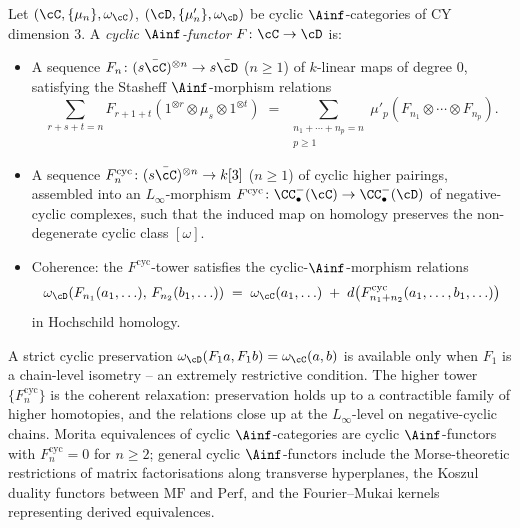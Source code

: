 \begin{definition}[Cyclic $\Ainf$-functor at $d = 3$]
\label{defn:cyclic-ainfty-functor-d3}
Let $(\cC, \{\mu_n\}, \omega_\cC)$, $(\cD, \{\mu'_n\}, \omega_\cD)$ be
cyclic $\Ainf$-categories of CY dimension $3$.  A \emph{cyclic
$\Ainf$-functor} $F \colon \cC \to \cD$ is:
\begin{itemize}
 \item A sequence $F_n \colon (s\bar\cC)^{\otimes n} \to s\bar\cD$
       ($n \geq 1$) of $k$-linear maps of degree $0$, satisfying the
       Stasheff $\Ainf$-morphism relations
       \[
        \sum_{r+s+t=n}
        F_{r+1+t}(1^{\otimes r} \otimes \mu_s \otimes 1^{\otimes t})
        \;=\;
        \sum_{\substack{n_1 + \cdots + n_p = n \\ p \geq 1}}
        \mu'_p(F_{n_1} \otimes \cdots \otimes F_{n_p}).
       \]
 \item A sequence $F_n^{\mathrm{cyc}} \colon
       (s\bar\cC)^{\otimes n} \to k[3]$ ($n \geq 1$) of cyclic
       higher pairings, assembled into an $L_\infty$-morphism
       $F^{\mathrm{cyc}} \colon \CC^{-}_\bullet(\cC) \to
       \CC^{-}_\bullet(\cD)$ of negative-cyclic complexes,
       such that the induced map on homology preserves the
       non-degenerate cyclic class $[\omega]$.
 \item Coherence: the $F^{\mathrm{cyc}}$-tower satisfies the
       cyclic-$\Ainf$-morphism relations
       \[
         \omega_\cD(F_{n_1}(a_1,\ldots),\, F_{n_2}(b_1,\ldots))
         \;=\;
         \omega_\cC(a_1,\ldots)
         \;+\; d\bigl(F_{n_1+n_2}^{\mathrm{cyc}}(a_1,\ldots,b_1,\ldots)\bigr)
       \]
       in Hochschild homology.
\end{itemize}
\end{definition}

\begin{remark}
\label{rem:why-higher-cyclic-tower}
A strict cyclic preservation $\omega_\cD(F_1 a, F_1 b) = \omega_\cC(a,b)$
is available only when $F_1$ is a chain-level isometry -- an
extremely restrictive condition.  The higher tower
$\{F_n^{\mathrm{cyc}}\}$ is the coherent relaxation: preservation
holds up to a contractible family of higher homotopies, and the
relations close up at the $L_\infty$-level on negative-cyclic chains.
Morita equivalences of cyclic $\Ainf$-categories are cyclic
$\Ainf$-functors with $F_n^{\mathrm{cyc}} = 0$ for $n \geq 2$; general
cyclic $\Ainf$-functors include the Morse-theoretic restrictions of
matrix factorisations along transverse hyperplanes, the Koszul
duality functors between $\mathrm{MF}$ and $\mathrm{Perf}$, and the
Fourier--Mukai kernels representing derived equivalences.
\end{remark}


